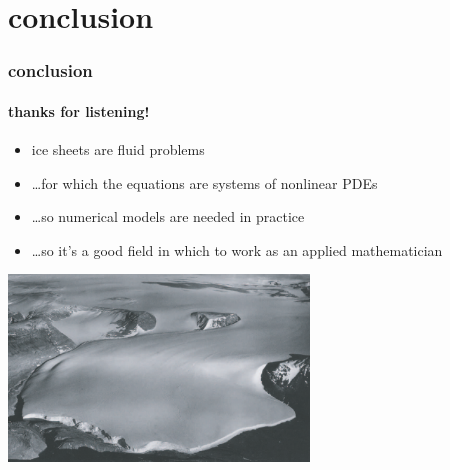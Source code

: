 \documentclass[10pt,hyperref={pdfpagelabels=true}]{beamer}
\begin{document}
\section*{conclusion}

\begin{frame}
  \frametitle{conclusion}
  \framesubtitle{thanks for listening!}

\begin{itemize}
\item ice sheets are fluid problems
\item \dots for which the equations are systems of nonlinear PDEs
\item \dots so numerical models are needed in practice
\item \dots so it's a good field in which to work as an applied mathematician
\end{itemize}

\begin{center}
\includegraphics[width=0.6\textwidth]{polaris}
\end{center}
\end{frame}
\end{document}
